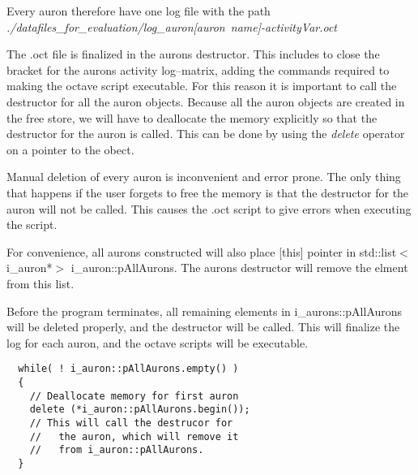 Every auron therefore have one log file with the path \\ \mbox{\emph{./datafiles\_for\_evaluation/log\_auron[auron name]-activityVar.oct }}

The .oct file is finalized in the aurons destructor. This includes to close the bracket for the aurons activity log--matrix, adding the commands required to making the octave script executable.
For this reason it is important to call the destructor for all the auron objects. 
Because all the auron objects are created in the free store, we will have to deallocate the memory explicitly so that the destructor for the auron is called. 
This can be done by using the \emph{delete} operator on a pointer to the obect.

Manual deletion of every auron is inconvenient and error prone. The only thing that happens if the user forgets to free the memory is that the destructor for the auron will not be called. 
This causes the .oct script to give errors when executing the script.

For convenience, all aurons constructed will also place [this] pointer in std::list$<$i\_auron*$>$ i\_auron::pAllAurons.
The aurons destructor will remove the elment from this list.

Before the program terminates, all remaining elements in i\_aurons::pAllAurons will be deleted properly, and the destructor will be called.
This will finalize the log for each auron, and the octave scripts will be executable.

\begin{lstlisting}
  while( ! i_auron::pAllAurons.empty() ) 
  { 
    // Deallocate memory for first auron
    delete (*i_auron::pAllAurons.begin()); 
    // This will call the destrucor for
    //   the auron, which will remove it
    //   from i_auron::pAllAurons.
  }   
\end{lstlisting}




